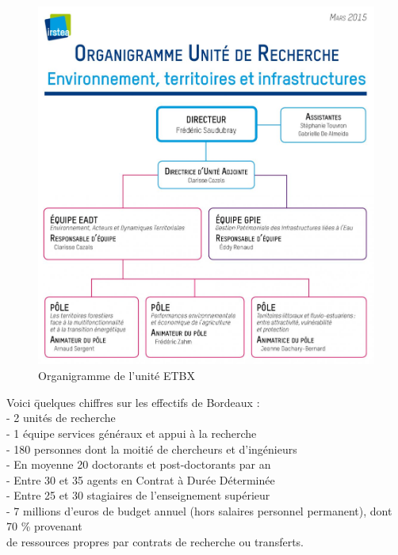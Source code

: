 \documentclass[12pt,a4paper,titlepage,twoside]{report}
\begin{document}
\begin{figure}[!ht]
\center
\includegraphics[width=12cm,height=12cm,keepaspectratio]{Image/Organigramme_UR_ETBX}%
\caption{Organigramme de l'unité ETBX} 
\label{Organigramme de l'unité ETBX}
\end{figure}



\begin{tabbing}
Voici \= quelques chiffres sur les effectifs de Bordeaux : \\
\> - 2 unités de recherche \\
\> - 1 équipe services généraux et appui à la recherche \\
\> - 180 personnes dont la moitié de chercheurs et d'ingénieurs \\
\> - En moyenne 20 doctorants et post-doctorants par an \\
\> - Entre 30 et 35 agents en Contrat à Durée Déterminée \\
\> - Entre 25 et 30 stagiaires de l'enseignement supérieur \\
\> - 7 millions d'euros de budget annuel (hors salaires personnel permanent), dont 70 \% provenant \\ 
\> de ressources propres par contrats de recherche ou transferts. \newline\newline
\end{tabbing}
\end{document}
